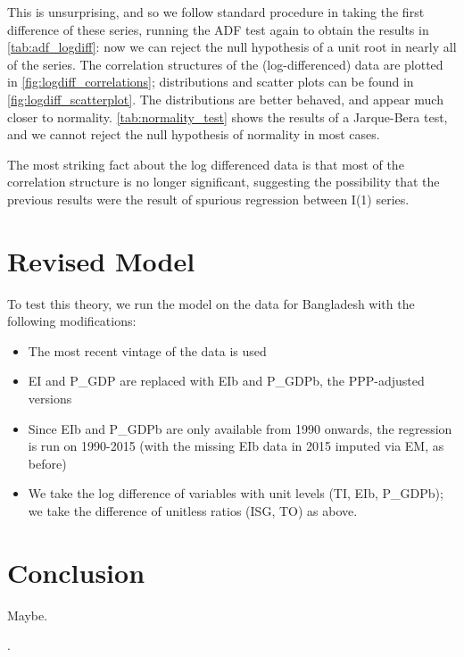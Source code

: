 \documentclass[11pt,a4paper]{article}
\begin{document}
This is unsurprising, and so we follow standard procedure in taking the first difference of these series, running the ADF test again to obtain the results in \cref{tab:adf_logdiff}: now we can reject the null hypothesis of a unit root in nearly all of the series.
The correlation structures of the (log-differenced) data are plotted in \cref{fig:logdiff_correlations}; distributions and scatter plots can be found in \cref{fig:logdiff_scatterplot}.
The distributions are better behaved, and appear much closer to normality.
\cref{tab:normality_test} shows the results of a Jarque-Bera test, and we cannot reject the null hypothesis of normality in most cases.

The most striking fact about the log differenced data is that most of the correlation structure is no longer significant, suggesting the possibility that the previous results were the result of spurious regression between I(1) series.

\section{Revised Model}\label{sec:revised_model}

To test this theory, we run the model on the data for Bangladesh with the following modifications:
\begin{itemize}
\item The most recent vintage of the data is used
\item EI and P\_GDP are replaced with EIb and P\_GDPb, the PPP-adjusted versions
\item Since EIb and P\_GDPb are only available from 1990 onwards, the regression is run on 1990-2015 (with the missing EIb data in 2015 imputed via EM, as before)
\item We take the log difference of variables with unit levels (TI, EIb, P\_GDPb); we take the difference of unitless ratios (ISG, TO) as above. 
\end{itemize}

\section{Conclusion}\label{sec:conclusion}
Maybe.

\clearpage

\appendix

\renewcommand{\refname}{\section{References}}.

\end{document}

